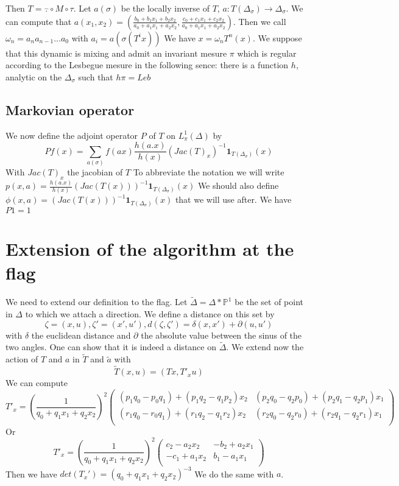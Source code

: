 \documentclass[12pt]{article}
\theoremstyle{plain}%
\theoremstyle{definition}
\theoremstyle{remark}
\begin{document}
Then $T=\overset{-}{.} \circ M \circ \tau$.\newline
Let $a(\sigma)$ be the locally inverse of $T$, $a:T(\Delta_\sigma) \to \Delta_\sigma$. We can compute that $a(x_1,x_2)=(\frac{b_0+b_1 x_1 + b_2 x_2}{a_0 + a_1 x_1 + a_2 x_2},\frac{c_0 + c_1 x_1 + c_2 x_2}{a_0 + a_1 x_1 + a_2 x_2})$. Then we call $\omega_n=a_n a_{n-1} ... a_0$ with $a_i=a(\sigma(T^i x))$\newline
We have $x=\omega_n T^n(x)$.
\newline
\color{green}
We suppose that this dynamic is mixing and admit an invariant mesure $\pi$ which is regular according to the Lesbegue mesure in the following sence: there is a function $h$, analytic on the $\Delta_\sigma$ such that $h \pi= Leb$
\color{black}

\subsection{Markovian operator}
We now define the adjoint operator $P$ of $T$ on $L^1_{\pi}(\Delta)$ by \[
Pf(x)=\sum_{a(\sigma)} f(a x)\frac{h(a.x)}{h(x)}(Jac(T)_x)^{-1} \mathbf{1} _{T(\Delta_\sigma)}(x)
\]
With $Jac(T)_x$ the jacobian of $T$\newline
To abbreviate the notation we will write $p(x,a)=\frac{h(a.x)}{h(x)}(Jac(T(x)))^{-1} \mathbf{1}_{T(\Delta_\sigma)}(x)$\newline
We should also define $\phi(x,a)=(Jac(T(x)))^{-1} \mathbf{1}_{T(\Delta_\sigma)}(x)$ that we will use after. \newline
We have $P1=1$

\section{Extension of the algorithm at the flag}
We need to extend our definition to the flag. Let $\tilde{\Delta}=\Delta*\mathbb{P}^1$ be the set of point in $\Delta$ to which we attach a direction. We define a distance on this set by \[
\zeta=(x,u),\zeta'=(x',u'),d(\zeta,\zeta')=\delta(x,x')+\partial (u,u')
\]
with $\delta$ the euclidean distance and $\partial$ the absolute value between the sinus of the two angles.
One can show that it is indeed a distance on $\tilde{\Delta}$.\newline
We extend now the action of $T$ and $a$ in $\tilde{T}$ and $\tilde{a}$ with\[
\tilde{T}(x,u)=(Tx,T'_x u)
\]
We can compute \[
T'_x=(\frac{1}{q_0+q_1 x_1 + q_2 x_2})^2 \begin{pmatrix}
(p_1 q_0 - p_0 q_1)+(p_1 q_2-q_1 p_2)x_2 & (p_2 q_0-q_2 p_0)+(p_2 q_1 -q_2 p_1) x_1 \\
(r_1 q_0 - r_0 q_1)+(r_1 q_2-q_1 r_2)x_2 & (r_2 q_0-q_2 r_0)+(r_2 q_1 -q_2 r_1) x_1 \\
\end{pmatrix}
\]
Or \[
T'_x = (\frac{1}{q_0+q_1 x_1 + q_2 x_2})^2 \begin{pmatrix}
c_2-a_2 x_2 & -b_2+a_2 x_1 \\
-c_1+a_1 x_2 & b_1 - a_1 x_1 \\
\end{pmatrix}
\]
Then we have $det(T_x')= (q_0+q_1 x_1 + q_2 x_2)^{-3}$ \newline
We do the same with $a$.
\end{document}
